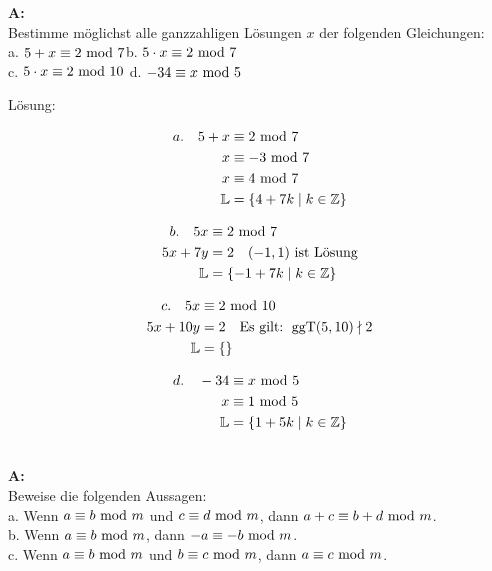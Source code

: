 \documentclass[landscape,twocolumn,a4paper]{article}
\begin{document}
\textbf{A:}   \\
Bestimme möglichst alle ganzzahligen Lösungen $x$ der folgenden
  Gleichungen: \\
a. $5+x\equiv2\text{ mod }7$\quad b.   $5\cdot x\equiv2\text{ mod }7$ \\ 
c. $5\cdot x\equiv2\text{ mod }10$  \quad d.  $-34\equiv x\text{ mod }5$
\bigskip {}

Lösung: 
\begin{minipage}[t]{4cm}
\begin{align*}
a. \quad 5 + x &\equiv 2 \text{ mod } 7 \\
x &\equiv -3 \text{ mod } 7 \\
x &\equiv 4 \text{ mod } 7 \\
\mathbb{L} &= \{4 +7k \mid k \in \mathbb{Z}\}
\end{align*}  
\end{minipage} 
\begin{minipage}[t]{4cm}
\begin{align*}
b. \quad 5 x &\equiv 2 \text{ mod } 7 \\
5x + 7y &= 2  \quad  (-1,1) \text{ ist Lösung} \\
\mathbb{L} &= \{-1 +7k \mid k \in \mathbb{Z}\}
\end{align*}  
\end{minipage} 

\begin{minipage}[t]{4cm} 
\begin{align*}
c. \quad 5 x &\equiv 2 \text{ mod } 10 \\
5x + 10y &= 2  \quad  \text{Es gilt: }\operatorname{ggT}(5,10) \nmid 2 \\
\mathbb{L} &= \{ \}
\end{align*}  
\end{minipage} 
\begin{minipage}[t]{4cm} 
\begin{align*}
d. \quad -34&\equiv x \text{ mod } 5 \\
x & \equiv 1 \text{ mod } 5 \\
\mathbb{L} &= \{1 + 5k \mid k \in \mathbb{Z} \}
\end{align*}  
\end{minipage} \\


\textbf{A:}   \\
Beweise die folgenden Aussagen:\\
a. Wenn $a\equiv b\text{ mod }m$ und $c\equiv d\text{ mod }m$, dann
    $a+c\equiv b+d\text{ mod }m$. \\
b. Wenn $a\equiv b\text{ mod }m$, dann $-a\equiv-b\text{ mod }m$. \\
c. Wenn $a\equiv b\text{ mod }m$ und $b\equiv c\text{ mod }m$, dann
    $a\equiv c\text{ mod }m$.
\bigskip {}
\end{document}
